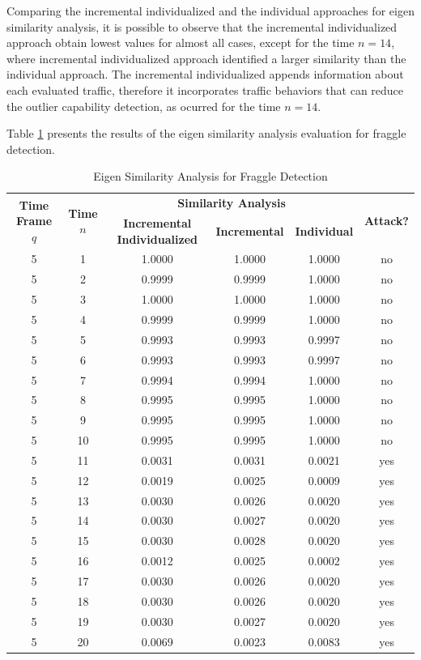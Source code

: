 Comparing the incremental individualized and the individual approaches for eigen similarity analysis, it is possible to observe that the incremental individualized approach obtain lowest values for almost all cases, except for the time $n=14$, where incremental individualized approach identified a larger similarity than the individual approach. The incremental individualized appends information about each evaluated traffic, therefore it incorporates traffic behaviors that can reduce the outlier capability detection, as ocurred for the time $n=14$.

Table \ref{tab:tab7} presents the results of the eigen similarity analysis evaluation for fraggle detection.

\begin{table}[h!]
  \centering
  \footnotesize
  \caption{Eigen Similarity Analysis for Fraggle Detection}
  \label{tab:tab7}
  \begin{tabular}{ c c c c c c }
	\toprule
	\multirow{2}{*}{\textbf{Time Frame} $q$} &\multirow{2}{*}{\textbf{Time} $n$}   &\multicolumn{3}{c}{\textbf{Similarity Analysis}} &\multirow{2}{*}{\textbf{Attack?}}\\ 
			\hhline{~~---~}
			& &\textbf{Incremental Individualized} &\textbf{Incremental} &\textbf{Individual}\\
	\midrule
	5 &1 &1.0000 &1.0000 &1.0000 &no \\
	5 &2 &0.9999 &0.9999 &1.0000 &no \\
	5 &3 &1.0000 &1.0000 &1.0000 &no \\
	5 &4 &0.9999 &0.9999 &1.0000 &no \\
	5 &5 &0.9993 &0.9993 &0.9997 &no \\
	5 &6 &0.9993 &0.9993 &0.9997 &no \\
	5 &7 &0.9994 &0.9994 &1.0000 &no \\
	5 &8 &0.9995 &0.9995 &1.0000 &no \\
	5 &9 &0.9995 &0.9995 &1.0000 &no \\
	5 &10 &0.9995 &0.9995 &1.0000 &no \\
	5 &11 &0.0031 &0.0031 &0.0021 &yes \\
	5 &12 &0.0019 &0.0025 &0.0009 &yes \\
	5 &13 &0.0030 &0.0026 &0.0020 &yes \\
	5 &14 &0.0030 &0.0027 &0.0020 &yes \\
	5 &15 &0.0030 &0.0028 &0.0020 &yes \\
	5 &16 &0.0012 &0.0025 &0.0002 &yes \\
	5 &17 &0.0030 &0.0026 &0.0020 &yes \\
	5 &18 &0.0030 &0.0026 &0.0020 &yes \\
	5 &19 &0.0030 &0.0027 &0.0020 &yes \\
	5 &20 &0.0069 &0.0023 &0.0083 &yes \\
    \bottomrule
  \end{tabular}
\end{table}

